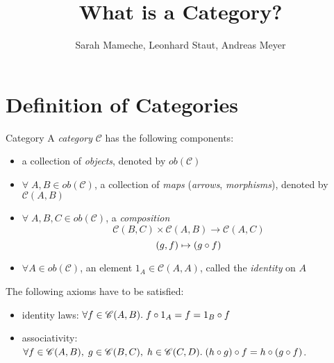 
\def\pathToRoot{../}

\usepackage{charter}
\selectfont


\title{What is a Category?}
\author{Sarah Mameche, Leonhard Staut, Andreas Meyer}
\maketitle

\section {Definition of Categories}
\begin{definition}{Category}
	A \emph{category} $\mathscr{C}$ has the following components:
	\begin{itemize}
		\item a collection of \emph{objects}, denoted by $ob(\mathscr{C})$
		\item $\forall \; A, B \in ob(\mathscr{C})$, a collection of \emph{maps} (\emph{arrows}, \emph{morphisms}), denoted by $\mathscr{C}(A, B)$
		\item $\forall \; A, B, C \in ob(\mathscr{C})$, a \emph{composition}
		\[\mathscr{C}(B, C) \times \mathscr{C}(A, B) \rightarrow  \mathscr{C}(A, C)
		\]		\[ (g,f) \mapsto (g \mathbin{\circ} f)
		\]
		\item $\forall A \in ob(\mathscr{C})$, an element $1_A \in \mathscr{C}(A, A)$, called the \emph{identity} on $A$ 
 	\end{itemize}
 The following axioms have to be satisfied:
 \begin{itemize}
 	\item identity laws: $\forall f \in \mathscr{C}(A, B). \; f \mathbin{\circ} 1_A = f = 1_B \mathbin{\circ} f$ 
 	\item associativity: $\forall f \in \mathscr{C}(A, B), \; g \in \mathscr{C}(B, C), \; h \in \mathscr{C}(C, D). \; (h \mathbin{\circ} g) \mathbin{\circ} f = h \mathbin{\circ} (g \mathbin{\circ} f) $.
 \end{itemize}
\end{definition}


